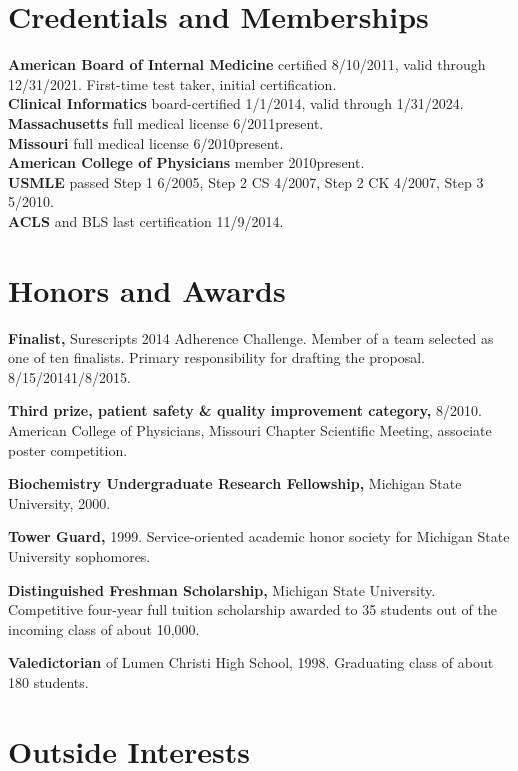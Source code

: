 \documentclass[12pt]{article}
\begin{document}
\section*{Credentials and Memberships}

\textbf{American Board of Internal Medicine} certified 8/10/2011,
valid through 12/31/2021. First-time test taker, initial
certification.\\
\textbf{Clinical Informatics} board-certified 1/1/2014, valid through
1/31/2024.\\
\textbf{Massachusetts} full medical license 6/2011\ndash{}present.\\
\textbf{Missouri} full medical license 6/2010\ndash{}present.\\
\textbf{American College of Physicians} member 2010\ndash{}present.\\
\textbf{USMLE} passed Step 1 6/2005, Step 2 CS 4/2007, Step 2 CK 4/2007, Step 3
5/2010.\\
\textbf{ACLS} and BLS last certification 11/9/2014.

\section*{Honors and Awards}

\textbf{Finalist,} Surescripts 2014 Adherence Challenge. Member of a
team selected as one of ten finalists. Primary responsibility for
drafting the proposal. 8/15/2014\ndash{}1/8/2015.

\textbf{Third prize, patient safety \& quality improvement category,}
8/2010. American College of Physicians, Missouri Chapter Scientific
Meeting, associate poster competition.

\textbf{Biochemistry Undergraduate Research Fellowship,} Michigan
State University, 2000.

\textbf{Tower Guard,} 1999. Service-oriented academic honor
society for Michigan State University sophomores.

\textbf{Distinguished Freshman Scholarship,} Michigan State
University. Competitive four-year full tuition scholarship awarded to
35 students out of the incoming class of about 10,000.

\textbf{Valedictorian} of Lumen Christi High School, 1998. Graduating
class of about 180 students.

\section*{Outside Interests}
\end{document}
